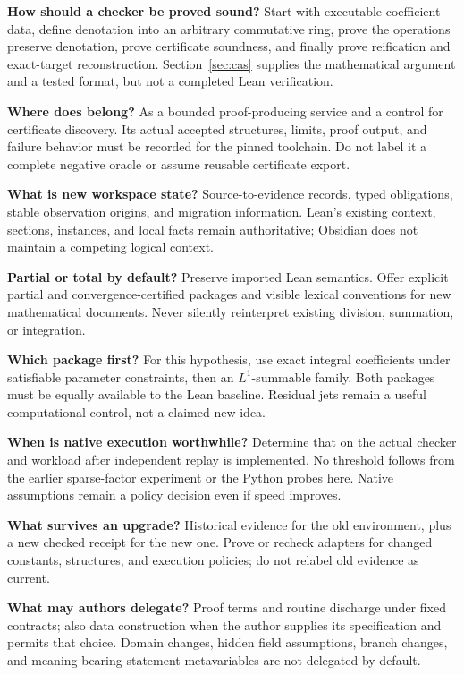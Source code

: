 \documentclass[11pt,a4paper]{article}
\newcommand{\code}[1]{\texttt{\detokenize{#1}}}
\theoremstyle{plain}\newtheorem{proposition}{Proposition}[section]
\theoremstyle{definition}\newtheorem{definition}[proposition]{Definition}
\theoremstyle{remark}\newtheorem{remark}[proposition]{Remark}
\begin{document}
\textbf{How should a checker be proved sound?} Start with executable coefficient data, define denotation into an arbitrary commutative ring, prove the operations preserve denotation, prove certificate soundness, and finally prove reification and exact-target reconstruction. Section~\ref{sec:cas} supplies the mathematical argument and a tested format, but not a completed Lean verification.

\textbf{Where does \code{grobner} belong?} As a bounded proof-producing service and a control for certificate discovery. Its actual accepted structures, limits, proof output, and failure behavior must be recorded for the pinned toolchain. Do not label it a complete negative oracle or assume reusable certificate export.

\textbf{What is new workspace state?} Source-to-evidence records, typed obligations, stable observation origins, and migration information. Lean's existing context, sections, instances, and local facts remain authoritative; Obsidian does not maintain a competing logical context.

\textbf{Partial or total by default?} Preserve imported Lean semantics. Offer explicit partial and convergence-certified packages and visible lexical conventions for new mathematical documents. Never silently reinterpret existing division, summation, or integration.

\textbf{Which package first?} For this hypothesis, use exact integral coefficients under satisfiable parameter constraints, then an \(L^1\)-summable family. Both packages must be equally available to the Lean baseline. Residual jets remain a useful computational control, not a claimed new idea.

\textbf{When is native execution worthwhile?} Determine that on the actual checker and workload after independent replay is implemented. No threshold follows from the earlier sparse-factor experiment or the Python probes here. Native assumptions remain a policy decision even if speed improves.

\textbf{What survives an upgrade?} Historical evidence for the old environment, plus a new checked receipt for the new one. Prove or recheck adapters for changed constants, structures, and execution policies; do not relabel old evidence as current.

\textbf{What may authors delegate?} Proof terms and routine discharge under fixed contracts; also data construction when the author supplies its specification and permits that choice. Domain changes, hidden field assumptions, branch changes, and meaning-bearing statement metavariables are not delegated by default.
\end{document}
